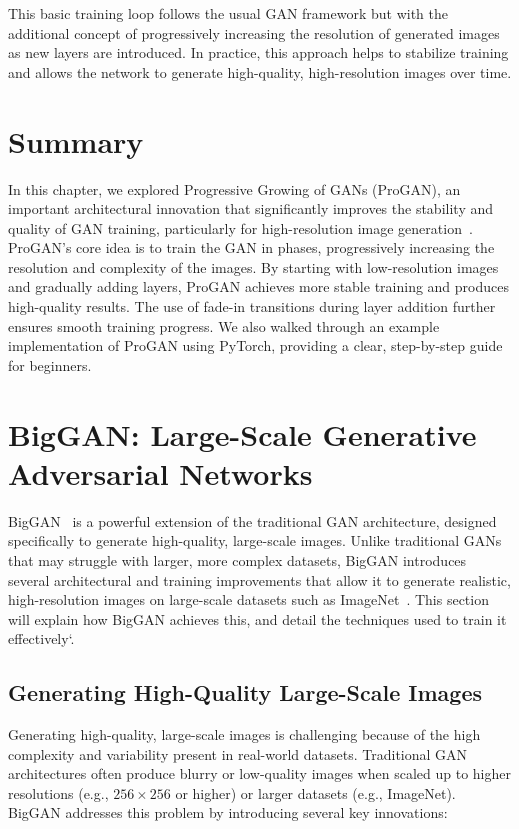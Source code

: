 This basic training loop follows the usual GAN framework but with the additional concept of progressively increasing the resolution of generated images as new layers are introduced. In practice, this approach helps to stabilize training and allows the network to generate high-quality, high-resolution images over time.

\section{Summary}
In this chapter, we explored Progressive Growing of GANs (ProGAN), an important architectural innovation that significantly improves the stability and quality of GAN training, particularly for high-resolution image generation~\cite{karras2017progressive}. ProGAN's core idea is to train the GAN in phases, progressively increasing the resolution and complexity of the images. By starting with low-resolution images and gradually adding layers, ProGAN achieves more stable training and produces high-quality results. The use of fade-in transitions during layer addition further ensures smooth training progress. We also walked through an example implementation of ProGAN using PyTorch, providing a clear, step-by-step guide for beginners.










\section{BigGAN: Large-Scale Generative Adversarial Networks}
BigGAN~\cite{donahue2019large} is a powerful extension of the traditional GAN architecture, designed specifically to generate high-quality, large-scale images. Unlike traditional GANs that may struggle with larger, more complex datasets, BigGAN introduces several architectural and training improvements that allow it to generate realistic, high-resolution images on large-scale datasets such as ImageNet~\cite{deng2009imagenet}. This section will explain how BigGAN achieves this, and detail the techniques used to train it effectively`\cite{zhou2024comprehensive}.

\subsection{Generating High-Quality Large-Scale Images}
Generating high-quality, large-scale images is challenging because of the high complexity and variability present in real-world datasets. Traditional GAN architectures often produce blurry or low-quality images when scaled up to higher resolutions (e.g., \(256 \times 256\) or higher) or larger datasets (e.g., ImageNet). BigGAN addresses this problem by introducing several key innovations:

